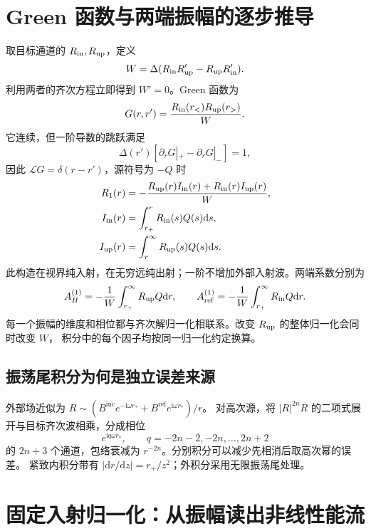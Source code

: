 \documentclass[UTF8,fontset=fandol,11pt,a4paper]{ctexart}
\newcommand{\ii}{\mathrm{i}}
\newcommand{\dd}{\mathrm{d}}
\newcommand{\Bin}{B^{\mathrm{inc}}}
\newcommand{\Bref}{B^{\mathrm{ref}}}
\newcommand{\AH}{A_H^{(1)}}
\newcommand{\Aref}{A_{\mathrm{ref}}^{(1)}}
\numberwithin{equation}{section}
\begin{document}
\section{Green 函数与两端振幅的逐步推导}
取目标通道的 $R_{\rm in},R_{\rm up}$，定义
\begin{equation}
W=\Delta(R_{\rm in}R'_{\rm up}-R_{\rm up}R'_{\rm in}).
\end{equation}
利用两者的齐次方程立即得到 $W'=0$。Green 函数为
\begin{equation}
G(r,r')=\frac{R_{\rm in}(r_<)R_{\rm up}(r_>)}W.
\end{equation}
它连续，但一阶导数的跳跃满足
\begin{equation}\Delta(r')[\partial_rG|_+-\partial_rG|_-]=1,\end{equation}
因此 $\mathcal L G=\delta(r-r')$，源符号为 $-Q$ 时
\begin{align}
R_1(r)&=-\frac{R_{\rm up}(r)I_{\rm in}(r)+R_{\rm in}(r)I_{\rm up}(r)}W,\\
I_{\rm in}(r)&=\int_{r_+}^r R_{\rm in}(s)Q(s)\dd s,\\
I_{\rm up}(r)&=\int_r^\infty R_{\rm up}(s)Q(s)\dd s.
\end{align}
此构造在视界纯入射，在无穷远纯出射；一阶不增加外部入射波。两端系数分别为
\begin{equation}
\AH=-\frac1W\int_{r_+}^\infty R_{\rm up}Q\dd r,\qquad
\Aref=-\frac1W\int_{r_+}^\infty R_{\rm in}Q\dd r.
\end{equation}
每一个振幅的维度和相位都与齐次解归一化相联系。改变 $R_{\rm up}$ 的整体归一化会同时改变 $W$，
积分中的每个因子均按同一归一化约定换算。

\subsection{振荡尾积分为何是独立误差来源}
外部场近似为 $R\sim(\Bin e^{-\ii\omega r_*}+\Bref e^{\ii\omega r_*})/r$。
对高次源，将 $|R|^{2n}R$ 的二项式展开与目标齐次波相乘，分成相位
\begin{equation}
e^{\ii q\omega r_*},\qquad q=-2n-2,-2n,\ldots,2n+2
\end{equation}
的 $2n+3$ 个通道，包络衰减为 $r^{-2n}$。分别积分可以减少先相消后取高次幂的误差。
紧致内积分带有 $|\dd r/\dd z|=r_+/z^2$；外积分采用无限振荡尾处理。

\section{固定入射归一化：从振幅读出非线性能流}
\end{document}
